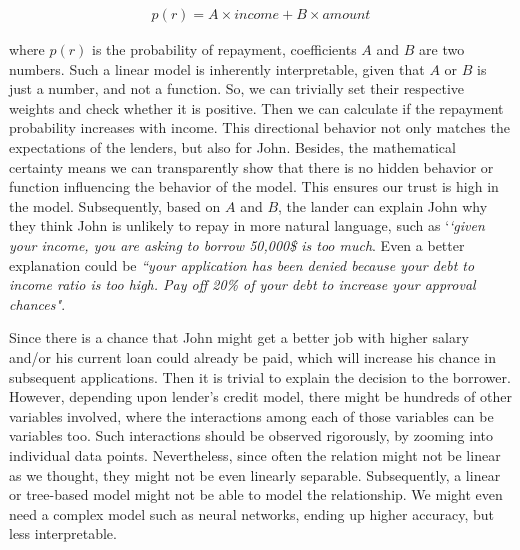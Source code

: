 \vspace{-2mm}
\begin{align}
    p(r) = A \times income + B \times amount
\end{align}

\hspace*{3.5mm} where $p(r)$ is the probability of repayment, coefficients $A$ and $B$ are two numbers. Such a linear model is inherently interpretable, given that $A$ or $B$ is just a number, and not a function. So, we can trivially set their respective weights and check whether it is positive. Then we can calculate if the repayment probability increases with income. This directional behavior not only matches the expectations of the lenders, but also for John. Besides, the mathematical certainty means we can transparently show that there is no hidden behavior or function influencing the behavior of the model. This ensures our trust is high in the model. Subsequently, based on $A$ and $B$, the lander can explain John why they think John is unlikely to repay in more natural language, such as `\textit{`given your income, you are asking to borrow 50,000\$ is too much}. Even a better explanation could be \textit{``your application has been denied because your debt to income ratio is too high. Pay off 20\% of your debt to increase your approval chances"}. 

\hspace*{3.5mm} Since there is a chance that John might get a better job with higher salary and/or his current loan could already be paid, which will increase his chance in subsequent applications. Then it is trivial to explain the decision to the borrower. However, depending upon lender's credit model, there might be hundreds of other variables involved, where the interactions among each of those variables can be variables too. Such interactions should be observed rigorously, by zooming into individual data points. Nevertheless, since often the relation might not be linear as we thought, they might not be even linearly separable. Subsequently, a linear or tree-based model might not be able to model the relationship. We might even need a complex model such as neural networks, ending up higher accuracy, but less interpretable.  

